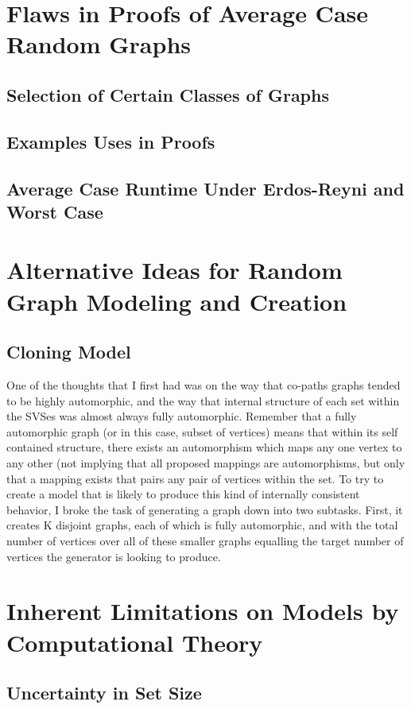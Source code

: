 \documentclass[11pt,a4paper]{report}
\begin{document}
\section{Flaws in Proofs of Average Case Random Graphs}
\subsection{Selection of Certain Classes of Graphs}
\subsection{Examples Uses in Proofs}
\subsection{Average Case Runtime Under Erdos-Reyni and Worst Case}

\section{Alternative Ideas for Random Graph Modeling and Creation}

\subsection{Cloning Model}
One of the thoughts that I first had was on the way that co-paths graphs tended to be highly automorphic, and the way that internal structure of each set within the SVSes was almost always fully automorphic.
Remember that a fully automorphic graph (or in this case, subset of vertices) means that within its self contained structure, there exists an automorphism which maps any one vertex to any other (not implying that all proposed mappings are automorphisms, but only that a mapping exists that pairs any pair of vertices within the set.
To try to create a model that is likely to produce this kind of internally consistent behavior, I broke the task of generating a graph down into two subtasks.
First, it creates K disjoint graphs, each of which is fully automorphic, and with the total number of vertices over all of these smaller graphs equalling the target number of vertices the generator is looking to produce.

\section{Inherent Limitations on Models by Computational Theory}
\subsection{Uncertainty in Set Size}
\end{document}
